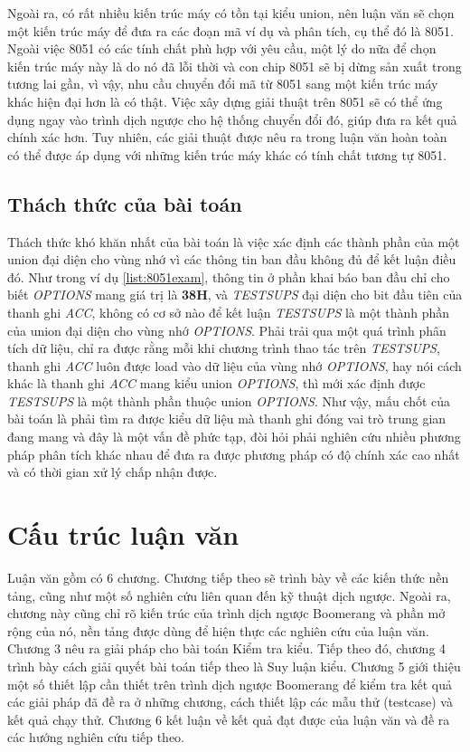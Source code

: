 Ngoài ra, có rất nhiều kiến trúc máy có tồn tại kiểu union, nên luận văn sẽ chọn một kiến trúc máy để đưa ra các đoạn mã ví dụ và phân tích, cụ thể đó là 8051. Ngoài việc 8051 có các tính chất phù hợp với yêu cầu, một lý do nữa để chọn kiến trúc máy này là do nó đã lỗi thời và con chip 8051 sẽ bị dừng sản xuất trong tương lai gần, vì vậy, nhu cầu chuyển đổi mã từ 8051 sang một kiến trúc máy khác hiện đại hơn là có thật. Việc xây dựng giải thuật trên 8051 sẽ có thể ứng dụng ngay vào trình dịch ngược cho hệ thống chuyển đổi đó, giúp đưa ra kết quả chính xác hơn. Tuy nhiên, các giải thuật được nêu ra trong luận văn hoàn toàn có thể được áp dụng với những kiến trúc máy khác có tính chất tương tự 8051.

\subsection{Thách thức của bài toán}
\label{sec:challenge}
Thách thức khó khăn nhất của bài toán là việc xác định các thành phần của một union đại diện cho vùng nhớ vì các thông tin ban đầu không đủ để kết luận điều đó. Như trong ví dụ \ref{list:8051exam}, thông tin ở phần khai báo ban đầu chỉ cho biết \textit{OPTIONS} mang giá trị là \textbf{38H}, và \textit{TESTSUPS} đại diện cho bit đầu tiên của thanh ghi \textit{ACC}, không có cơ sở nào để kết luận \textit{TESTSUPS} là một thành phần của union đại diện cho vùng nhớ \textit{OPTIONS}. Phải trải qua một quá trình phân tích dữ liệu, chỉ ra được rằng mỗi khi chương trình thao tác trên \textit{TESTSUPS}, thanh ghi \textit{ACC} luôn được load vào dữ liệu của vùng nhớ \textit{OPTIONS}, hay nói cách khác là thanh ghi \textit{ACC} mang kiểu union \textit{OPTIONS}, thì mới xác định được \textit{TESTSUPS} là một thành phần thuộc union \textit{OPTIONS}. Như vậy, mấu chốt của bài toán là phải tìm ra được kiểu dữ liệu mà thanh ghi đóng vai trò trung gian đang mang và đây là một vấn đề phức tạp, đòi hỏi phải nghiên cứu nhiều phương pháp phân tích khác nhau để đưa ra được phương pháp có độ chính xác cao nhất và có thời gian xử lý chấp nhận được.


\section{Cấu trúc luận văn}

Luận văn gồm có 6 chương. Chương tiếp theo sẽ trình bày về các kiến thức nền tảng, cũng như một số nghiên cứu liên quan đến kỹ thuật dịch ngược. Ngoài ra, chương này cũng chỉ rõ kiến trúc của trình dịch ngược Boomerang và phần mở rộng của nó, nền tảng được dùng để hiện thực các nghiên cứu của luận văn. Chương 3 nêu ra giải pháp cho bài toán Kiểm tra kiểu. Tiếp theo đó, chương 4 trình bày cách giải quyết bài toán tiếp theo là Suy luận kiểu. Chương 5 giới thiệu một số thiết lập cần thiết trên trình dịch ngược Boomerang để kiểm tra kết quả các giải pháp đã đề ra ở những chương, cách thiết lập các mẫu thử (testcase) và kết quả chạy thử. Chương 6 kết luận về kết quả đạt được của luận văn và đề ra các hướng nghiên cứu tiếp theo.
	
